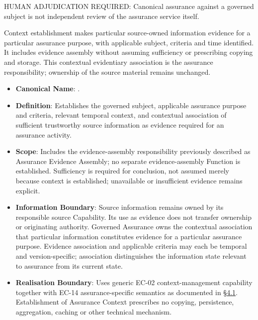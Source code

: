 HUMAN ADJUDICATION REQUIRED: Canonical assurance against a governed subject is not independent review of the assurance service itself.



Context establishment makes particular source-owned information evidence for a particular assurance purpose, with applicable subject, criteria and time identified. It includes evidence assembly without assuming sufficiency or prescribing copying and storage. This contextual evidentiary association is the assurance responsibility; ownership of the source material remains unchanged.



\begin{itemize}

\item
\textbf{Canonical Name}: \texttt{}.



\item
\textbf{Definition}: Establishes the governed subject, applicable assurance purpose and criteria, relevant temporal context, and contextual association of sufficient trustworthy source information as evidence required for an assurance activity.



\item
\textbf{Scope}: Includes the evidence-assembly responsibility previously described as Assurance Evidence Assembly; no separate evidence-assembly Function is established. Sufficiency is required for conclusion, not assumed merely because context is established; unavailable or insufficient evidence remains explicit.



\item
\textbf{Information Boundary}: Source information remains owned by its responsible source Capability. Its use as evidence does not transfer ownership or originating authority. Governed Assurance owns the contextual association that particular information constitutes evidence for a particular assurance purpose. Evidence association and applicable criteria may each be temporal and version-specific; association distinguishes the information state relevant to assurance from its current state.



\item
\textbf{Realisation Boundary}: Uses generic EC-02 context-management capability together with EC-14 assurance-specific semantics as documented in \href{https://github.com/fhirfactory/harmonia/blob/98410db60155198a75f74c79d98060070209faa1/docs/markdown/03-business-architecture/behaviours/health-service-assurance.md\#41-context-management-contribution}{§4.1}. Establishment of Assurance Context prescribes no copying, persistence, aggregation, caching or other technical mechanism.



\end{itemize}





